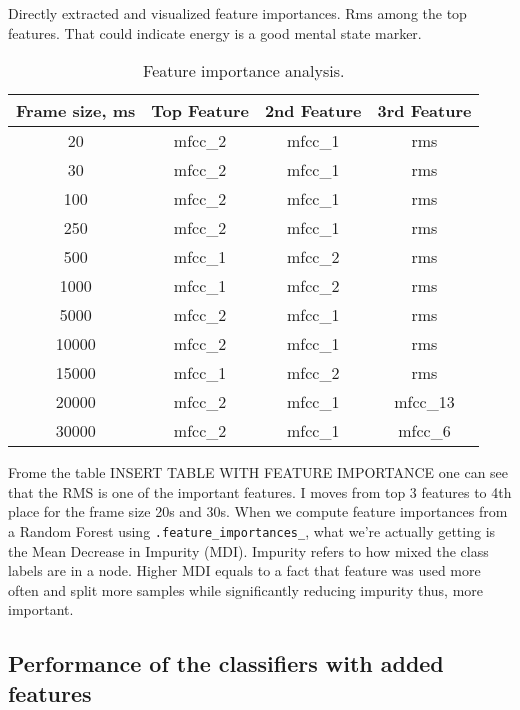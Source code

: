 \documentclass[conference]{IEEEtran}
\begin{document}
Directly extracted and visualized feature importances. 
Rms among the top features. 
That could indicate energy is a good mental state marker.

\begin{table}[h]
\centering
\caption{Feature importance analysis.}
\begin{tabular}{|c|c|c|c|}
\hline
\textbf{Frame size, ms} & \textbf{Top Feature} & \textbf{2nd Feature} & \textbf{3rd Feature}\\
\hline
20 & mfcc\_2 & mfcc\_1 & rms \\
\hline
30 & mfcc\_2 & mfcc\_1 & rms \\
\hline
100 & mfcc\_2 & mfcc\_1 & rms \\
\hline
250 & mfcc\_2 & mfcc\_1 & rms \\
\hline
500 & mfcc\_1 & mfcc\_2 & rms \\
\hline
1000 & mfcc\_1 & mfcc\_2 & rms \\
\hline
5000 & mfcc\_2 & mfcc\_1 & rms \\
\hline
10000 & mfcc\_2 & mfcc\_1 & rms \\
\hline
15000 & mfcc\_1 & mfcc\_2 & rms \\
\hline
20000 & mfcc\_2 & mfcc\_1 & mfcc\_13 \\
\hline
30000 & mfcc\_2 & mfcc\_1 & mfcc\_6 \\
\hline
\end{tabular}
\label{tab:feaure_importance}
\end{table}


Frome the table INSERT TABLE WITH FEATURE IMPORTANCE one can see that the RMS is one of the important features. 
I moves from top 3 features to 4th place for the frame size 20s and 30s.
When we compute feature importances from a Random Forest using \texttt{.feature\_importances\_}, what we're actually getting is the Mean Decrease in Impurity (MDI). 
Impurity refers to how mixed the class labels are in a node.
Higher MDI equals to a fact that feature was used more often and split more samples while significantly reducing impurity thus, 
more important.


\subsection{Performance of the classifiers with added features}

\end{document}
